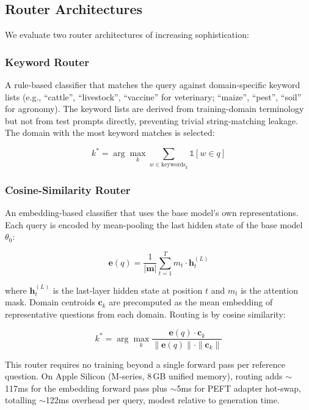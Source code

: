 \documentclass[conference, 10pt]{IEEEtran}
\begin{document}
\subsection{Router Architectures}
\label{sec:routers}

We evaluate two router architectures of increasing sophistication:

\subsubsection{Keyword Router}
A rule-based classifier that matches the query against domain-specific
keyword lists (e.g., ``cattle'', ``livestock'', ``vaccine'' for
veterinary; ``maize'', ``pest'', ``soil'' for agronomy).
The keyword lists are derived from training-domain terminology but
not from test prompts directly, preventing trivial string-matching
leakage.
The domain with the most keyword matches is selected:

\begin{equation}
    k^* = \arg\max_{k} \sum_{w \in \text{keywords}_k}
    \mathbb{1}[w \in q]
\end{equation}

\subsubsection{Cosine-Similarity Router}
An embedding-based classifier that uses the base model's own
representations. Each query is encoded by mean-pooling the last
hidden state of the base model $\theta_0$:

\begin{equation}
    \mathbf{e}(q) = \frac{1}{|\mathbf{m}|} \sum_{t=1}^{T}
    m_t \cdot \mathbf{h}_t^{(L)}
\end{equation}

\noindent where $\mathbf{h}_t^{(L)}$ is the last-layer hidden state at
position $t$ and $m_t$ is the attention mask.
Domain centroids $\mathbf{c}_k$ are precomputed as the mean embedding of
representative questions from each domain.
Routing is by cosine similarity:

\begin{equation}
    k^* = \arg\max_{k} \frac{\mathbf{e}(q) \cdot \mathbf{c}_k}
    {\|\mathbf{e}(q)\| \cdot \|\mathbf{c}_k\|}
\end{equation}

\noindent This router requires no training beyond a single forward pass
per reference question. On Apple Silicon (M-series, 8\,GB unified
memory), routing adds $\sim$117ms for the embedding forward pass
plus $\sim$5ms for PEFT adapter hot-swap, totalling $\sim$122ms
overhead per query, modest relative to generation time.
\end{document}
